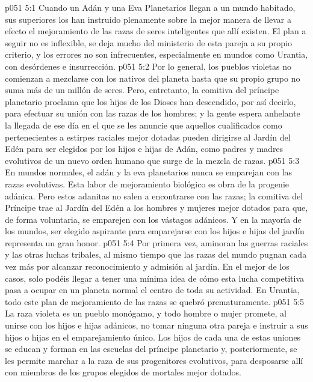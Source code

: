 \vs p051 5:1 Cuando un Adán y una Eva Planetarios llegan a un mundo habitado, sus superiores los han instruido plenamente sobre la mejor manera de llevar a efecto el mejoramiento de las razas de seres inteligentes que allí existen. El plan a seguir no es inflexible, se deja mucho del ministerio de esta pareja a su propio criterio, y los errores no son infrecuentes, especialmente en mundos como Urantia, con desórdenes e insurrección.
\vs p051 5:2 Por lo general, los pueblos violetas no comienzan a mezclarse con los nativos del planeta hasta que su propio grupo no suma más de un millón de seres. Pero, entretanto, la comitiva del príncipe planetario proclama que los hijos de los Dioses han descendido, por así decirlo, para efectuar su unión con las razas de los hombres; y la gente espera anhelante la llegada de ese día en el que se les anuncie que aquellos cualificados como pertenecientes a estirpes raciales mejor dotadas pueden dirigirse al Jardín del Edén para ser elegidos por los hijos e hijas de Adán, como padres y madres evolutivos de un nuevo orden humano que surge de la mezcla de razas.
\vs p051 5:3 En mundos normales, el adán y la eva planetarios nunca se emparejan con las razas evolutivas. Esta labor de mejoramiento biológico es obra de la progenie adánica. Pero estos adanitas no salen a encontrarse con las razas; la comitiva del Príncipe trae al Jardín del Edén a los hombres y mujeres mejor dotados para que, de forma voluntaria, se emparejen con los vástagos adánicos. Y en la mayoría de los mundos, ser elegido aspirante para emparejarse con los hijos e hijas del jardín representa un gran honor.
\vs p051 5:4 Por primera vez, aminoran las guerras raciales y las otras luchas tribales, al mismo tiempo que las razas del mundo pugnan cada vez más por alcanzar reconocimiento y admisión al jardín. En el mejor de los casos, solo podéis llegar a tener una mínima idea de cómo esta lucha competitiva pasa a ocupar en un planeta normal el centro de toda su actividad. En Urantia, todo este plan de mejoramiento de las razas se quebró prematuramente.
\vs p051 5:5 \pc La raza violeta es un pueblo monógamo, y todo hombre o mujer promete, al unirse con los hijos e hijas adánicos, no tomar ninguna otra pareja e instruir a sus hijos o hijas en el emparejamiento único. Los hijos de cada una de estas uniones se educan y forman en las escuelas del príncipe planetario y, posteriormente, se les permite marchar a la raza de sus progenitores evolutivos, para desposarse allí con miembros de los grupos elegidos de mortales mejor dotados.
